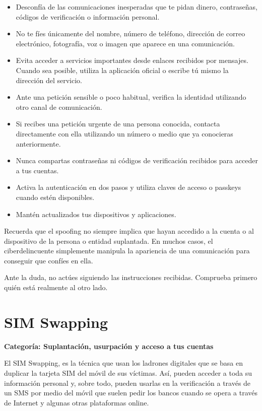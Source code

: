 \documentclass[
  spanish,
  a4paper,
  openany]{book}
\begin{document}
\begin{itemize}
\item
  Desconfía de las comunicaciones inesperadas que te pidan dinero, contraseñas, códigos de verificación o información personal.
\item
  No te fíes únicamente del nombre, número de teléfono, dirección de correo electrónico, fotografía, voz o imagen que aparece en una comunicación.
\item
  Evita acceder a servicios importantes desde enlaces recibidos por mensajes. Cuando sea posible, utiliza la aplicación oficial o escribe tú mismo la dirección del servicio.
\item
  Ante una petición sensible o poco habitual, verifica la identidad utilizando otro canal de comunicación.
\item
  Si recibes una petición urgente de una persona conocida, contacta directamente con ella utilizando un número o medio que ya conocieras anteriormente.
\item
  Nunca compartas contraseñas ni códigos de verificación recibidos para acceder a tus cuentas.
\item
  Activa la autenticación en dos pasos y utiliza claves de acceso o passkeys cuando estén disponibles.
\item
  Mantén actualizados tus dispositivos y aplicaciones.
\end{itemize}

Recuerda que el spoofing no siempre implica que hayan accedido a la cuenta o al dispositivo de la persona o entidad suplantada. En muchos casos, el ciberdelincuente simplemente manipula la apariencia de una comunicación para conseguir que confíes en ella.

Ante la duda, no actúes siguiendo las instrucciones recibidas. Comprueba primero quién está realmente al otro lado.

\section{SIM Swapping}\label{sim-swapping}

\textbf{Categoría: Suplantación, usurpación y acceso a tus cuentas}

El SIM Swapping, es la técnica que usan los ladrones digitales que se basa en duplicar la tarjeta SIM del móvil de sus víctimas. Así, pueden acceder a toda su información personal y, sobre todo, pueden usarlas en la verificación a través de un SMS por medio del móvil que suelen pedir los bancos cuando se opera a través de Internet y algunas otras plataformas online.
\end{document}
